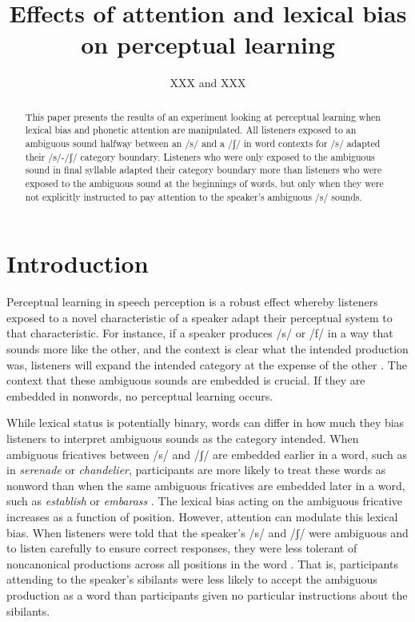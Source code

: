 \documentclass[a4paper,11pt,twocolumn]{article}
\title{Effects of attention and lexical bias on perceptual learning}
\author{XXX and XXX}
\begin{document}
\maketitle

\begin{abstract}
This paper presents the results of an experiment looking at perceptual learning when lexical bias and phonetic attention are manipulated.  All listeners exposed to an ambiguous sound halfway between an /s/ and a /ʃ/ in word contexts for /s/ adapted their /s/-/ʃ/ category boundary.  Listeners who were only exposed to the ambiguous sound in final syllable adapted their category boundary more than listeners who were exposed to the ambiguous sound at the beginnings of words, but only when they were not explicitly instructed to pay attention to the speaker's ambiguous /s/ sounds.  
\end{abstract}



\section{Introduction}

Perceptual learning in speech perception is a robust effect whereby listeners exposed to a novel characteristic of a speaker adapt their perceptual system to that characteristic.  For instance, if a speaker produces /s/ or /f/ in a way that sounds more like the other, and the context is clear what the intended production was, listeners will expand the intended category at the expense of the other \cite{Norris2003}.  The context that these ambiguous sounds are embedded is crucial.  If they are embedded in nonwords, no perceptual learning occurs. 

While lexical status is potentially binary, words can differ in how much they bias listeners to interpret ambiguous sounds as the category intended.  When ambiguous fricatives between /s/ and /ʃ/ are embedded earlier in a word, such as in \emph{serenade} or \emph{chandelier}, participants are more likely to treat these words as nonword than when the same ambiguous fricatives are embedded later in a word, such as \emph{establish} or \emph{embarass} \cite{Pitt2012}.  The lexical bias acting on the ambiguous fricative increases as a function of position.  However, attention can modulate this lexical bias.  When listeners were told that the speaker's /s/ and /ʃ/ were ambiguous and to listen carefully to ensure correct responses, they were less tolerant of noncanonical productions across all positions in the word \cite{Pitt2012}.  That is, participants attending to the speaker's sibilants were less likely to accept the ambiguous production as a word than participants given no particular instructions about the sibilants.
\end{document}
